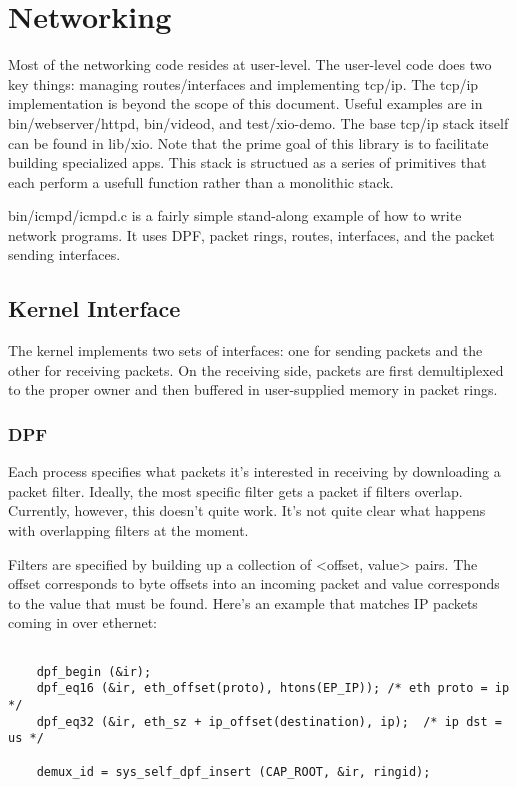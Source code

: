 \section{Networking}

Most of the networking code resides at user-level. The user-level code
does two key things: managing routes/interfaces and implementing
tcp/ip. The tcp/ip implementation is beyond the scope of this
document.  Useful examples are in bin/webserver/httpd, bin/videod, and
test/xio-demo. The base tcp/ip stack itself can be found in
lib/xio. Note that the prime goal of this library is to facilitate
building specialized apps. This stack is structued as a series of
primitives that each perform a usefull function rather than a
monolithic stack.

bin/icmpd/icmpd.c is a fairly simple stand-along example of how to
write network programs. It uses DPF, packet rings, routes, interfaces,
and the packet sending interfaces.

\subsection{Kernel Interface}

The kernel implements two sets of interfaces: one for sending packets
and the other for receiving packets. On the receiving side, packets
are first demultiplexed to the proper owner and then buffered in
user-supplied memory in packet rings. 

\subsubsection {DPF}

Each process specifies what packets it's interested in receiving by
downloading a packet filter. Ideally, the most specific filter
gets a packet if filters overlap. Currently, however, this doesn't
quite work. It's not quite clear what happens with overlapping filters
at the moment.

Filters are specified by building up a collection of <offset, value>
pairs. The offset corresponds to byte offsets into an incoming packet
and value corresponds to the value that must be found. Here's an example
that matches IP packets coming in over ethernet:

\begin{verbatim}

    dpf_begin (&ir);
    dpf_eq16 (&ir, eth_offset(proto), htons(EP_IP)); /* eth proto = ip */
    dpf_eq32 (&ir, eth_sz + ip_offset(destination), ip);  /* ip dst = us */

    demux_id = sys_self_dpf_insert (CAP_ROOT, &ir, ringid);

\end{verbatim}

